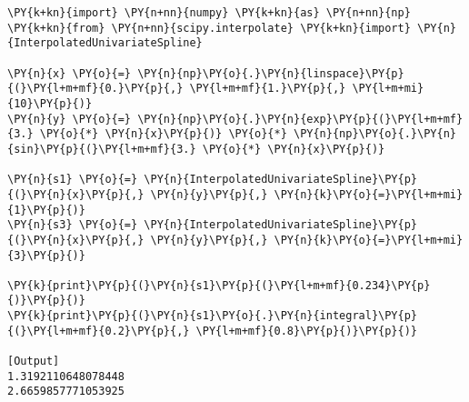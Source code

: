 \begin{Verbatim}[label=\makebox{\url{https://github.com/lucabaldini/cmepda/tree/master/slides/latex/snippets/spline.py}},commandchars=\\\{\}]
\PY{k+kn}{import} \PY{n+nn}{numpy} \PY{k+kn}{as} \PY{n+nn}{np}
\PY{k+kn}{from} \PY{n+nn}{scipy.interpolate} \PY{k+kn}{import} \PY{n}{InterpolatedUnivariateSpline}

\PY{n}{x} \PY{o}{=} \PY{n}{np}\PY{o}{.}\PY{n}{linspace}\PY{p}{(}\PY{l+m+mf}{0.}\PY{p}{,} \PY{l+m+mf}{1.}\PY{p}{,} \PY{l+m+mi}{10}\PY{p}{)}
\PY{n}{y} \PY{o}{=} \PY{n}{np}\PY{o}{.}\PY{n}{exp}\PY{p}{(}\PY{l+m+mf}{3.} \PY{o}{*} \PY{n}{x}\PY{p}{)} \PY{o}{*} \PY{n}{np}\PY{o}{.}\PY{n}{sin}\PY{p}{(}\PY{l+m+mf}{3.} \PY{o}{*} \PY{n}{x}\PY{p}{)}

\PY{n}{s1} \PY{o}{=} \PY{n}{InterpolatedUnivariateSpline}\PY{p}{(}\PY{n}{x}\PY{p}{,} \PY{n}{y}\PY{p}{,} \PY{n}{k}\PY{o}{=}\PY{l+m+mi}{1}\PY{p}{)}
\PY{n}{s3} \PY{o}{=} \PY{n}{InterpolatedUnivariateSpline}\PY{p}{(}\PY{n}{x}\PY{p}{,} \PY{n}{y}\PY{p}{,} \PY{n}{k}\PY{o}{=}\PY{l+m+mi}{3}\PY{p}{)}

\PY{k}{print}\PY{p}{(}\PY{n}{s1}\PY{p}{(}\PY{l+m+mf}{0.234}\PY{p}{)}\PY{p}{)}
\PY{k}{print}\PY{p}{(}\PY{n}{s1}\PY{o}{.}\PY{n}{integral}\PY{p}{(}\PY{l+m+mf}{0.2}\PY{p}{,} \PY{l+m+mf}{0.8}\PY{p}{)}\PY{p}{)}

[Output]
1.3192110648078448
2.6659857771053925
\end{Verbatim}